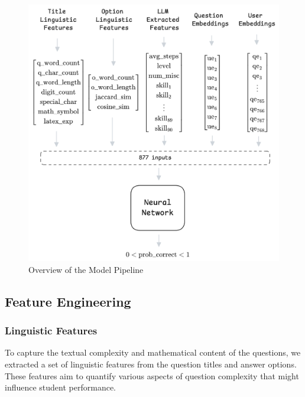 \documentclass[
    a4paper, %
    10pt, %
    twoside, %
]{LTJournalArticle}
\begin{document}
\begin{figure}[H]
    \centering
    \includegraphics[width=\columnwidth]{images/model_diagram.png}
    \caption{Overview of the Model Pipeline}
    \label{fig:model-pipeline}
\end{figure}

\subsection{Feature Engineering}

\subsubsection{Linguistic Features}
To capture the textual complexity and mathematical content of the questions, we extracted a set of linguistic features from the question titles and answer options. These features aim to quantify various aspects of question complexity that might influence student performance.
\end{document}

